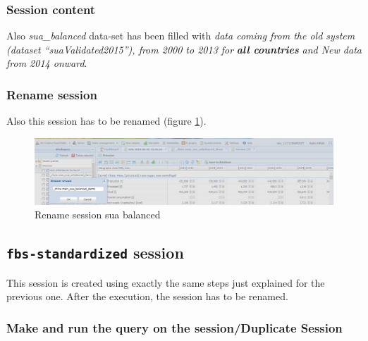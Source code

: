 \documentclass[]{article}
\begin{document}
\subsubsection{Session content}\label{session-content}

Also \emph{sua\_balanced} data-set has been filled with \emph{data
coming from the old system (dataset ``suaValidated2015''), from 2000 to
2013 for} \textbf{\emph{all countries}} \emph{and New data from 2014
onward}.

\subsubsection{Rename session}\label{rename-session-1}

Also this session has to be renamed (figure \ref{fig:f20}).

\begin{figure}[H]

{\centering \includegraphics[width=1\linewidth]{images/standPlugin/20_renameBalanced} 

}

\caption{\label{fig:f20}Rename session sua balanced}\label{fig:f20}
\end{figure}

\subsection{\texorpdfstring{\texttt{fbs-standardized}
session}{fbs-standardized session}}\label{fbs-standardized-session}

This session is created using exactly the same steps just explained for
the previous one. After the execution, the session has to be renamed.

\subsubsection{Make and run the query on the session/Duplicate
Session}\label{make-and-run-the-query-on-the-sessionduplicate-session-1}
\end{document}
